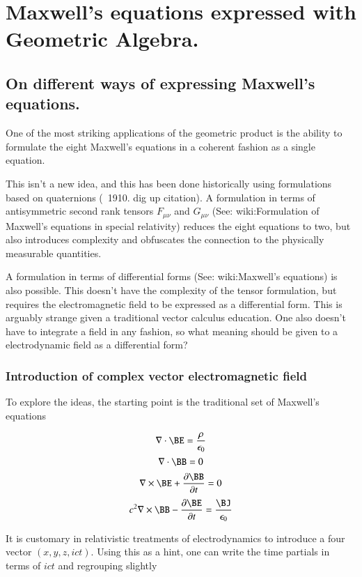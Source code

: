 \chapter{Maxwell's equations expressed with Geometric Algebra.} 
\date{January 29, 2008.  Last Revision: $Date: 2009/06/04 13:13:27 $ }

\section{On different ways of expressing Maxwell's equations.}

One of the most striking applications of the geometric product is the ability to formulate the eight Maxwell's equations in a coherent fashion as a single equation.

This isn't a new idea, and this has been done historically using formulations based on quaternions (~1910.  dig up citation).  A formulation in terms of antisymmetric second rank tensors $F_{\mu \nu}$ and $G_{\mu \nu}$ (See: wiki:Formulation of Maxwell's equations in special relativity) reduces the eight equations to two, but also introduces complexity and obfuscates the connection to the physically measurable quantities.

A formulation in terms of differential forms (See: wiki:Maxwell's equations) is also possible.  This doesn't have the complexity of the tensor formulation, but requires the electromagnetic field to be expressed as a differential form.  This is arguably strange given a traditional vector calculus education.  One also doesn't have to integrate a field in any fashion, so what meaning should be given to a electrodynamic field as a differential form?

\subsection{Introduction of complex vector electromagnetic field }

To explore the ideas, the starting point is the traditional set of Maxwell's equations

\[
\nabla \cdot \BE  = \frac {\rho} {\epsilon_0}
\]
\[
\nabla \cdot \BB  = 0
\]
\[
\nabla \times \BE  +\frac{\partial \BB } {\partial t} = 0
\]
\[
c^2 \nabla \times \BB  - \frac{\partial \BE } {\partial t}
= \frac{\BJ}{\epsilon_0}
\]

It is customary in relativistic treatments of electrodynamics to introduce a four vector $(x, y, z, ict)$.  Using this as a hint, one can write the time partials in terms of $ict$ and regrouping slightly

